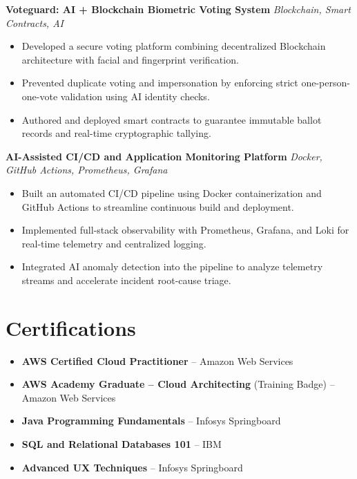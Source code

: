 \documentclass[10pt,letterpaper]{article}
\newcommand{\resumeProjectHeading}[2]{
  \vspace{3.5pt}
  \textbf{#1} \hfill \textit{#2}\\
  \vspace{-1.5pt}
}
\begin{document}
\resumeProjectHeading
  {Voteguard: AI + Blockchain Biometric Voting System}{Blockchain, Smart Contracts, AI}
  \begin{itemize}
    \item Developed a secure voting platform combining decentralized Blockchain architecture with facial and fingerprint verification.
    \item Prevented duplicate voting and impersonation by enforcing strict one-person-one-vote validation using AI identity checks.
    \item Authored and deployed smart contracts to guarantee immutable ballot records and real-time cryptographic tallying.
  \end{itemize}

\resumeProjectHeading
  {AI-Assisted CI/CD and Application Monitoring Platform}{Docker, GitHub Actions, Prometheus, Grafana}
  \begin{itemize}
    \item Built an automated CI/CD pipeline using Docker containerization and GitHub Actions to streamline continuous build and deployment.
    \item Implemented full-stack observability with Prometheus, Grafana, and Loki for real-time telemetry and centralized logging.
    \item Integrated AI anomaly detection into the pipeline to analyze telemetry streams and accelerate incident root-cause triage.
  \end{itemize}

\section{Certifications}
\begin{itemize}
  \item \textbf{AWS Certified Cloud Practitioner} -- Amazon Web Services
  \item \textbf{AWS Academy Graduate -- Cloud Architecting} (Training Badge) -- Amazon Web Services
  \item \textbf{Java Programming Fundamentals} -- Infosys Springboard
  \item \textbf{SQL and Relational Databases 101} -- IBM
  \item \textbf{Advanced UX Techniques} -- Infosys Springboard
\end{itemize}
\end{document}
